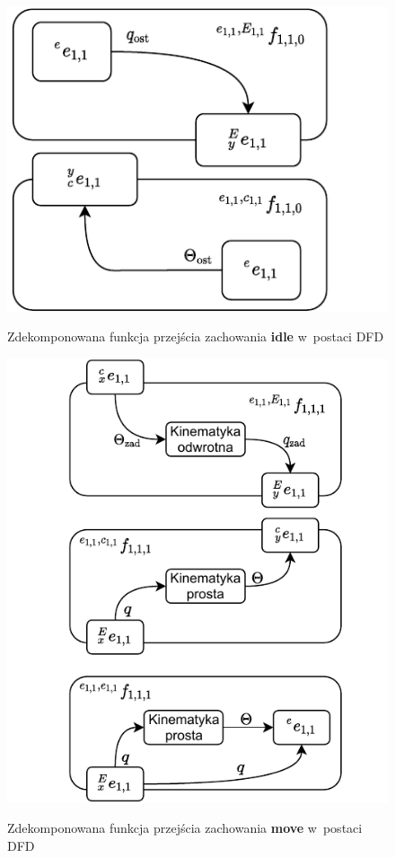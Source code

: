 \begin{figure}
    \centering
    \includegraphics[width=\columnwidth]{figures/ISR-ve-manip-fp-idle.pdf}
    \label{fig:ve-manip-fp-idle}
    \caption{Zdekomponowana funkcja przejścia zachowania \textbf{idle} w~postaci DFD}
\end{figure}

\begin{figure}
    \centering
    \includegraphics[width=\columnwidth]{figures/ISR-ve-manip-fp-move.pdf}
    \label{fig:ve-manip-fp-idle}
    \caption{Zdekomponowana funkcja przejścia zachowania \textbf{move} w~postaci DFD}
\end{figure}